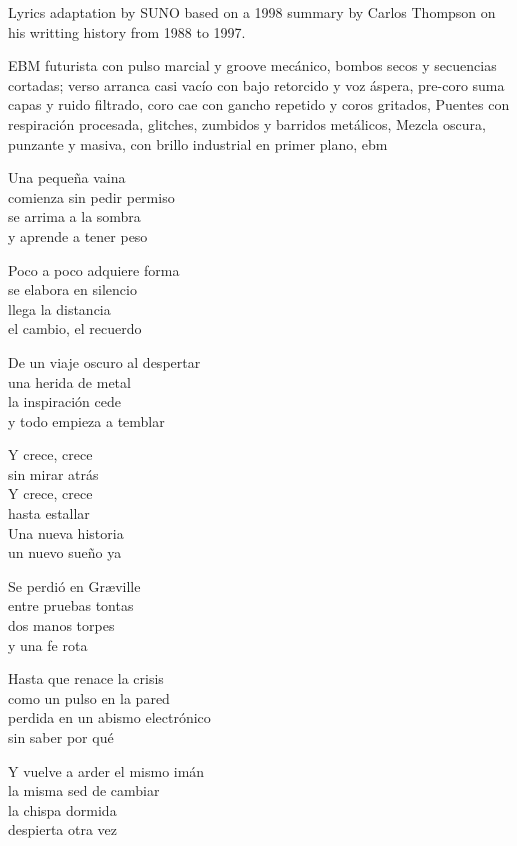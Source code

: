 
\begin{notes}
Lyrics adaptation by SUNO based on a 1998 summary by Carlos Thompson on his writting history from 1988 to 1997.
\end{notes}
\begin{style}
EBM futurista con pulso marcial y groove mecánico, bombos secos y secuencias cortadas; verso arranca casi vacío con bajo retorcido y voz áspera, pre-coro suma capas y ruido filtrado, coro cae con gancho repetido y coros gritados, Puentes con respiración procesada, glitches, zumbidos y barridos metálicos, Mezcla oscura, punzante y masiva, con brillo industrial en primer plano, ebm
\end{style}
\begin{lyrics}
Una pequeña vaina\\
comienza sin pedir permiso\\
se arrima a la sombra\\
y aprende a tener peso

Poco a poco adquiere forma\\
se elabora en silencio\\
llega la distancia\\
el cambio, el recuerdo

De un viaje oscuro al despertar\\
una herida de metal\\
la inspiración cede\\
y todo empieza a temblar

Y crece, crece\\
sin mirar atrás\\
Y crece, crece\\
hasta estallar\\
Una nueva historia\\
un nuevo sueño ya

Se perdió en Græville\\
entre pruebas tontas\\
dos manos torpes\\
y una fe rota

Hasta que renace la crisis\\
como un pulso en la pared\\
perdida en un abismo electrónico\\
sin saber por qué

Y vuelve a arder el mismo imán\\
la misma sed de cambiar\\
la chispa dormida\\
despierta otra vez


\end{lyrics}
